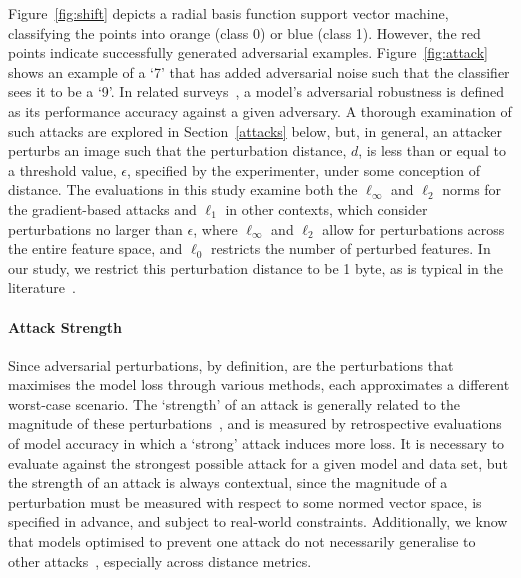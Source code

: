 Figure~\ref{fig:shift} depicts a radial basis function support vector machine, classifying the points into orange (class 0) or blue (class 1).
However, the red points indicate successfully generated adversarial examples.
Figure~\ref{fig:attack} shows an example of a `7' that has added adversarial noise such that the classifier sees it to be a `9'.
In related surveys~\cite{dohmatob_generalized_2019,biggio_evasion_2013-1,bect_bayesian_2017,chakraborty_adversarial_2018,carlini_towards_2017,croce_reliable_2020}, a model's adversarial robustness is defined as its performance accuracy against a given adversary.
A thorough examination of such attacks are explored in Section~\ref{attacks} below, but, in general, an attacker perturbs an image such that the perturbation distance, $d$, is less than or equal to a threshold value, $\epsilon$, specified by the experimenter, under some conception of distance.
The evaluations in this study examine both the $\ell_{\infty}$ and $\ell_2$ norms for the gradient-based attacks and $\ell_1$ in other contexts, which consider perturbations no larger than $\epsilon$, where $\ell_{\infty}$ and $\ell_2$ allow for perturbations across the entire feature space, and $\ell_0$ restricts the number of perturbed features.
In our study, we restrict this perturbation distance to be 1 byte, as is typical in the literature~\cite{madry2017towards,miller_adversarial_2020,biggio_evasion_2013,biggio_multiple_2009}.

\paragraph{Attack Strength}
 Since adversarial perturbations, by definition, are the perturbations that maximises the model loss through various methods, each approximates a different worst-case scenario.
The `strength' of an attack is generally related to the magnitude of these perturbations~\cite{carlini_towards_2017}, and is measured by retrospective evaluations of model accuracy in which a `strong' attack induces more loss.
It is necessary to evaluate against the strongest possible attack for a given model and data set, but the strength of an attack is always contextual, since the magnitude of a perturbation must be measured with respect to some normed vector space, is specified in advance, and subject to real-world constraints.
Additionally, we know that models optimised to prevent one attack do not necessarily generalise to other attacks~\cite{carlini_towards_2017}, especially across distance metrics.


